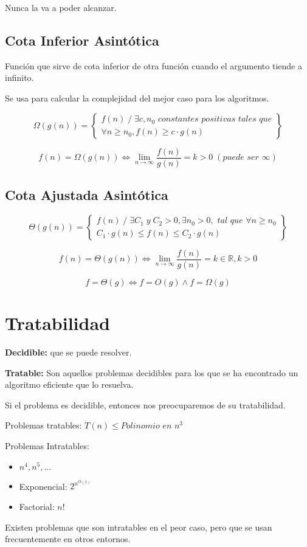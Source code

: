 Nunca la va a poder alcanzar.

\subsection{Cota Inferior Asintótica}
Función que sirve de cota inferior de otra función cuando el argumento tiende a infinito.

Se usa para calcular la complejidad del mejor caso para los algoritmos.

$$\Omega(g(n))=\left\{\begin{matrix}
  f(n)\;/\;\exists c, n_0 \textit{ constantes positivas tales que}  \\
  \forall n \geq n_0, f(n) \geq c \cdot g(n)
  \end{matrix}\right\}$$

$$f(n)=\Omega(g(n)) \Leftrightarrow \lim_{n \rightarrow \infty} \frac{f(n)}{g(n)}= k > 0 \;(\textit{puede ser }\infty)$$

\subsection{Cota Ajustada Asintótica}
$$\Theta(g(n))=\left\{\begin{matrix}
  f(n)\;/\;\exists C_1 \;y\; C_2 >0, \exists n_0>0, \textit{ tal que } \forall n \geq n_0  \\
  C_1 \cdot g(n) \leq f(n) \leq C_2 \cdot g(n)
  \end{matrix}\right\}$$

$$f(n)=\Theta(g(n)) \Leftrightarrow \lim_{n \rightarrow \infty} \frac{f(n)}{g(n)}= k \in \mathbb{R}, k > 0$$

$$f = \Theta(g) \Leftrightarrow f = O(g) \wedge f = \Omega(g) $$

\section{Tratabilidad}\label{sec:tratabilidad}
\textbf{Decidible:} que se puede resolver.

\textbf{Tratable:} Son aquellos problemas decidibles para los que se ha encontrado un algoritmo eficiente que lo resuelva.

Si el problema es decidible, entonces nos preocuparemos de su tratabilidad.

Problemas tratables: $T(n) \leq \textit{Polinomio en } n^3$

Problemas Intratables:
\begin{itemize}
  \item $n^4, n^5, ...$
  \item Exponencial: $2^{n^{O(1)}}$
  \item Factorial: $n!$
\end{itemize} 

Existen problemas que son intratables en el peor caso, pero que se usan frecuentemente en otros entornos.